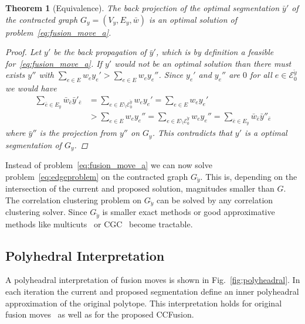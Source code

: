 \documentclass[10pt,twocolumn,letterpaper]{article}
\newtheorem{theorem}{Theorem}
\theoremstyle{definition}
\begin{document}
\begin{theorem}[Equivalence]\label{thm:Equivalence}
The back projection of the optimal segmentation $\bar{y}'$ of the contracted graph $G_y=(V_y,E_y, \bar{w})$
is an optimal solution of problem~\ref{eq:fusion_move_a}.
\begin{proof}
Let $y'$ be the back propagation of $\bar{y}'$, which is by definition a feasible for~\ref{eq:fusion_move_a}.
If $y'$ would not be an optimal solution than there must exists $y''$ with 
$\sum_{e\in E} w_ey_e' > \sum_{e\in E} w_ey_e''$.
Since $y_e'$ and $y_e''$ are $0$ for all $e \in \mathcal{E}_0^{\breve{y}}$ we would have
\begin{align*}
  \sum_{\bar{e}\in E_y} \bar{w}_{\bar{e}}\bar{y}'_{\bar{e}}
 &= \sum_{e\in E \setminus \mathcal{E}_0^{\breve{y}}} w_ey_e'          
  = \sum_{e\in E} w_ey_e' \\
 &> \sum_{e\in E} w_ey_e''
  = \sum_{e\in E \setminus \mathcal{E}_0^{\breve{y}}} w_ey_e''
  =\sum_{\bar{e}\in E_y} \bar{w}_{\bar{e}}\bar{y}''_{\bar{e}}
\end{align*}
where $\bar{y}''$ is the projection from $y''$ on $G_y$.
This contradicts that $y'$ is a optimal segmentation of $G_y$.
\end{proof}
%
\end{theorem}

Instead of problem~\ref{eq:fusion_move_a} we can now solve problem~\ref{eq:edgeproblem} on the contracted graph $G_{\breve{y}}$.
This is, depending on the intersection of the current and proposed solution, magnitudes smaller than $G$.
The correlation clustering problem on $G_{\breve{y}}$ can be solved by any correlation clustering solver.
Since $G_{\breve{y}}$ is smaller exact methods or good approximative methods like 
multicuts~\cite{kappes_2013_arxiv} or CGC~\cite{beier_2014_cvpr}
become tractable.


%






\subsection{Polyhedral Interpretation}
A polyheadral interpretation of fusion moves is shown in Fig.~\ref{fig:polyheadral}.
In each iteration the current and proposed segmentation define an inner polyheadral 
approximation of the original polytope. This interpretation holds for original 
fusion moves~\cite{Lempitsky-2010} as well as for the proposed CCFusion.
\end{document}
